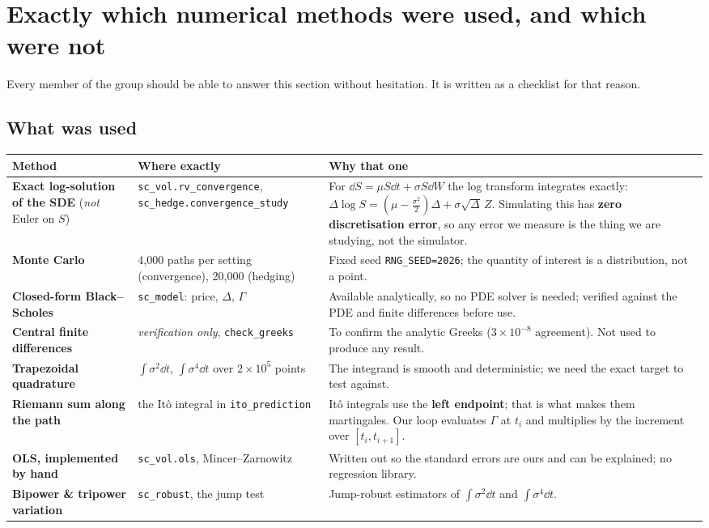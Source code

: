 \documentclass[11pt,a4paper]{article}
\begin{document}
\section{Exactly which numerical methods were used, and which were not}
\label{sec:methods}

Every member of the group should be able to answer this section without hesitation. It is
written as a checklist for that reason.

\subsection{What was used}

\begin{table}[H]
\centering\small
\begin{tabular}{L{3.6cm}L{5.4cm}L{6.0cm}}
\toprule
\textbf{Method} & \textbf{Where exactly} & \textbf{Why that one} \\
\midrule
\textbf{Exact log-solution of the SDE} (\emph{not} Euler on $S$) &
\texttt{sc\_vol.rv\_convergence}, \texttt{sc\_hedge.convergence\_study} &
For $\dd S=\mu S\dd t+\sigma S\dd W$ the log transform integrates exactly:
$\Delta\log S=(\mu-\tfrac{\sigma^2}{2})\Delta+\sigma\sqrt{\Delta}\,Z$. Simulating this has
\textbf{zero discretisation error}, so any error we measure is the thing we are studying, not
the simulator. \\
\addlinespace
\textbf{Monte Carlo} & 4{,}000 paths per setting (convergence), 20{,}000 (hedging) &
Fixed seed \texttt{RNG\_SEED=2026}; the quantity of interest is a distribution, not a point. \\
\addlinespace
\textbf{Closed-form Black--Scholes} & \texttt{sc\_model}: price, $\Delta$, $\Gamma$ &
Available analytically, so no PDE solver is needed; verified against the PDE and finite
differences before use. \\
\addlinespace
\textbf{Central finite differences} & \emph{verification only}, \texttt{check\_greeks} &
To confirm the analytic Greeks ($3\times10^{-8}$ agreement). Not used to produce any result. \\
\addlinespace
\textbf{Trapezoidal quadrature} & $\int\sigma^2\dd t$, $\int\sigma^4\dd t$ over $2\times10^5$
points & The integrand is smooth and deterministic; we need the exact target to test against. \\
\addlinespace
\textbf{Riemann sum along the path} & the It\^o integral in \texttt{ito\_prediction} &
It\^o integrals use the \textbf{left endpoint}; that is what makes them martingales. Our
loop evaluates $\Gamma$ at $t_i$ and multiplies by the increment over $[t_i,t_{i+1}]$. \\
\addlinespace
\textbf{OLS, implemented by hand} & \texttt{sc\_vol.ols}, Mincer--Zarnowitz &
Written out so the standard errors are ours and can be explained; no regression library. \\
\addlinespace
\textbf{Bipower \& tripower variation} & \texttt{sc\_robust}, the jump test &
Jump-robust estimators of $\int\sigma^2\dd t$ and $\int\sigma^4\dd t$. \\
\bottomrule
\end{tabular}
\end{table}
\end{document}
